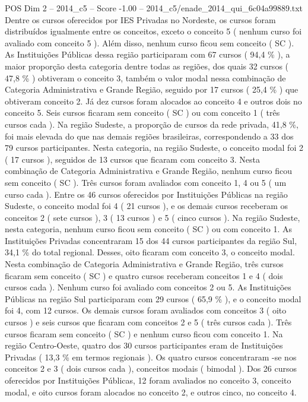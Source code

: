 \begin{textsample}{POS Dim 2 – 2014\_c5 – Score -1.00 – 2014\_c5/enade\_2014\_qui\_6c04a99889.txt}
Dentre os cursos oferecidos por IES Privadas no Nordeste, os cursos foram distribuídos igualmente entre os conceitos, exceto o conceito 5 ( nenhum curso foi avaliado com conceito 5 ).
Além disso, nenhum curso ficou sem conceito ( SC ).
As Instituições Públicas dessa região participaram com 67 cursos ( 94,4 \% ), a maior proporção desta categoria dentre todas as regiões, dos quais 32 cursos ( 47,8 \% ) obtiveram o conceito 3, também o valor modal nessa combinação de Categoria Administrativa e Grande Região, seguido por 17 cursos ( 25,4 \% ) que obtiveram conceito 2.
Já dez cursos foram alocados ao conceito 4 e outros dois no conceito 5.
Seis cursos ficaram sem conceito ( SC ) ou com conceito 1 ( três cursos cada ).
Na região Sudeste, a proporção de cursos da rede privada, 41,8 \%, foi mais elevada do que nas demais regiões brasileiras, correspondendo a 33 dos 79 cursos participantes.
Nesta categoria, na região Sudeste, o conceito modal foi 2 ( 17 cursos ), seguidos de 13 cursos que ficaram com conceito 3.
Nesta combinação de Categoria Administrativa e Grande Região, nenhum curso ficou sem conceito ( SC ).
Três cursos foram avaliados com conceito 1, 4 ou 5 ( um curso cada ).
Entre os 46 cursos oferecidos por Instituições Públicas na região Sudeste, o conceito modal foi 4 ( 21 cursos ), e os demais cursos receberam os conceitos 2 ( sete cursos ), 3 ( 13 cursos ) e 5 ( cinco cursos ).
Na região Sudeste, nesta categoria, nenhum curso ficou sem conceito ( SC ) ou com conceito 1.
As Instituições Privadas concentraram 15 dos 44 cursos participantes da região Sul, 34,1 \% do total regional.
Desses, oito ficaram com conceito 3, o conceito modal.
Nesta combinação de Categoria Administrativa e Grande Região, três cursos ficaram sem conceito ( SC ) e quatro cursos receberam conceitos 1 e 4 ( dois cursos cada ).
Nenhum curso foi avaliado com conceitos 2 ou 5.
As Instituições Públicas na região Sul participaram com 29 cursos ( 65,9 \% ), e o conceito modal foi 4, com 12 cursos.
Os demais cursos foram avaliados com conceitos 3 ( oito cursos ) e seis cursos que ficaram com conceitos 2 e 5 ( três cursos cada ).
Três cursos ficaram sem conceito ( SC ) e nenhum curso ficou com conceito 1.
Na região Centro-Oeste, quatro dos 30 cursos participantes eram de Instituições Privadas ( 13,3 \% em termos regionais ).
Os quatro cursos concentraram -se nos conceitos 2 e 3 ( dois cursos cada ), conceitos modais ( bimodal ).
Dos 26 cursos oferecidos por Instituições Públicas, 12 foram avaliados no conceito 3, conceito modal, e oito cursos foram alocados no conceito 2, e outros cinco, no conceito 4.

\end{textsample}
